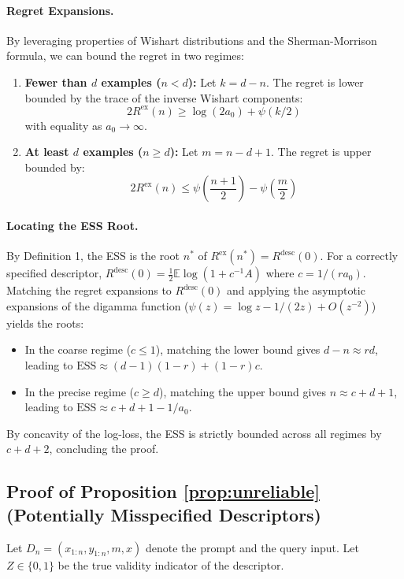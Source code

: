 \documentclass{article}
\begin{document}
\paragraph{Regret Expansions.}
By leveraging properties of Wishart distributions and the Sherman-Morrison formula, we can bound the regret in two regimes:
\begin{enumerate}
    \item \textbf{Fewer than $d$ examples ($n < d$):} Let $k = d - n$. The regret is lower bounded by the trace of the inverse Wishart components:
    \begin{equation}
        2R^{\text{ex}}(n) \ge \log(2a_0) + \psi(k/2)
    \end{equation}
    with equality as $a_0 \to \infty$.
    \item \textbf{At least $d$ examples ($n \ge d$):} Let $m = n - d + 1$. The regret is upper bounded by:
    \begin{equation}
        2R^{\text{ex}}(n) \le \psi\left(\frac{n+1}{2}\right) - \psi\left(\frac{m}{2}\right)
    \end{equation}
\end{enumerate}

\paragraph{Locating the ESS Root.}
By Definition 1, the ESS is the root $n^*$ of $R^{\text{ex}}(n^*) = R^{\text{desc}}(0)$. For a correctly specified descriptor, $R^{\text{desc}}(0) = \frac{1}{2}\mathbb{E}\log(1 + c^{-1} A)$ where $c = 1/(ra_0)$.
Matching the regret expansions to $R^{\text{desc}}(0)$ and applying the asymptotic expansions of the digamma function ($\psi(z) = \log z - 1/(2z) + O(z^{-2})$) yields the roots:
\begin{itemize}
    \item In the coarse regime ($c \le 1$), matching the lower bound gives $d - n \approx rd$, leading to $\text{ESS} \approx (d-1)(1-r) + (1-r)c$.
    \item In the precise regime ($c \ge d$), matching the upper bound gives $n \approx c + d + 1$, leading to $\text{ESS} \approx c + d + 1 - 1/a_0$.
\end{itemize}
By concavity of the log-loss, the ESS is strictly bounded across all regimes by $c + d + 2$, concluding the proof.

\subsection{Proof of Proposition \ref{prop:unreliable} (Potentially Misspecified Descriptors)}
Let $D_n = (x_{1:n}, y_{1:n}, m, x)$ denote the prompt and the query input. Let $Z \in \{0, 1\}$ be the true validity indicator of the descriptor.
\end{document}
